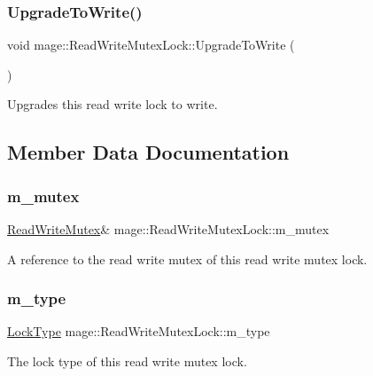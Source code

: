 \subsubsection{\texorpdfstring{Upgrade\+To\+Write()}{UpgradeToWrite()}}
{\footnotesize\ttfamily void mage\+::\+Read\+Write\+Mutex\+Lock\+::\+Upgrade\+To\+Write (\begin{DoxyParamCaption}{ }\end{DoxyParamCaption})\hspace{0.3cm}{\ttfamily [noexcept]}}

Upgrades this read write lock to write. 

\subsection{Member Data Documentation}
\hypertarget{structmage_1_1_read_write_mutex_lock_a6ee9034fa984e11ec07c20ec77ab1bfe}{}\label{structmage_1_1_read_write_mutex_lock_a6ee9034fa984e11ec07c20ec77ab1bfe} 
\subsubsection{\texorpdfstring{m\+\_\+mutex}{m\_mutex}}
{\footnotesize\ttfamily \hyperlink{structmage_1_1_read_write_mutex}{Read\+Write\+Mutex}\& mage\+::\+Read\+Write\+Mutex\+Lock\+::m\+\_\+mutex\hspace{0.3cm}{\ttfamily [private]}}

A reference to the read write mutex of this read write mutex lock. \hypertarget{structmage_1_1_read_write_mutex_lock_a754d235c4ba2f8f8da51342ad497a735}{}\label{structmage_1_1_read_write_mutex_lock_a754d235c4ba2f8f8da51342ad497a735} 
\subsubsection{\texorpdfstring{m\+\_\+type}{m\_type}}
{\footnotesize\ttfamily \hyperlink{structmage_1_1_read_write_mutex_lock_a5fee0529edf58803ee1f5d4afa084a3b}{Lock\+Type} mage\+::\+Read\+Write\+Mutex\+Lock\+::m\+\_\+type\hspace{0.3cm}{\ttfamily [private]}}

The lock type of this read write mutex lock. 